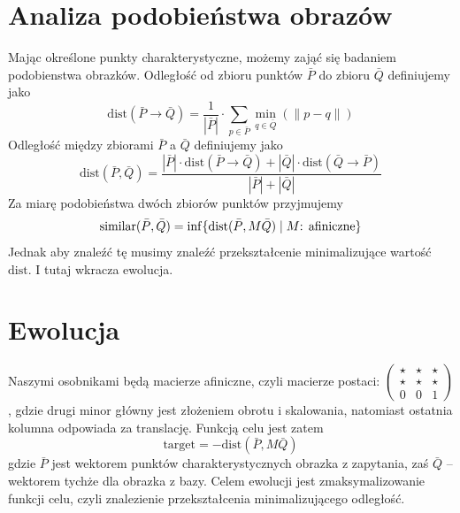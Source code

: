 \documentclass[a4paper,12pt,leqno]{article}
\newcommand{\nel}[1]{|#1|}
\newcommand{\dist}{\mathrm{dist}}
\newcommand{\target}{\mathrm{target}}
\begin{document}
\section{Analiza podobieństwa obrazów}

Mając określone punkty charakterystyczne, możemy zająć się badaniem podobienstwa obrazków.
Odległość od zbioru punktów $\bar P$ do zbioru $\bar Q$ definiujemy jako
\[ \dist(\bar P \rightarrow \bar Q) = \frac{1}{\nel{\bar P}} \cdot \sum_{p \in \bar P} \min_{q \in \bar Q}(\|p - q\|) \]
Odległość między zbiorami $\bar P$ a $\bar Q$ definiujemy jako
\[ \dist(\bar P, \bar Q) = \frac{\nel{\bar P} \cdot \dist(\bar P \rightarrow \bar Q) + \nel{\bar Q} \cdot \dist(\bar Q \rightarrow \bar P)}{\nel{\bar P} + \nel{\bar Q}} \]
Za miarę podobieństwa dwóch zbiorów punktów przyjmujemy
\[ \mathrm{similar}(\bar P, \bar Q) = \inf\{\dist(\bar P, M\bar Q) \;\arrowvert\; M\text{: afiniczne}\} \]
Jednak aby znaleźć tę musimy znaleźć przekształcenie minimalizujące wartość $\dist$. I tutaj wkracza ewolucja. 

\section{Ewolucja}

Naszymi osobnikami będą macierze afiniczne, czyli macierze postaci:
$\begin{pmatrix}
\star & \star & \star \\
\star & \star & \star \\
0 & 0 & 1
\end{pmatrix}$, gdzie drugi minor główny jest złożeniem obrotu i skalowania, natomiast ostatnia kolumna odpowiada za translację.
Funkcją celu jest zatem 
\[ \target = -\dist(\bar P,  M\bar Q) \]
gdzie $\bar P$ jest wektorem punktów charakterystycznych obrazka z zapytania, zaś $\bar Q$ -- wektorem tychże dla obrazka z bazy.
Celem ewolucji jest zmaksymalizowanie funkcji celu, czyli znalezienie przekształcenia minimalizującego odległość.
\end{document}
